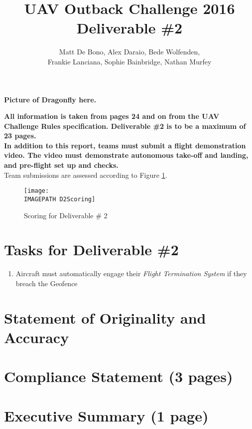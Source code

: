 \documentclass{article}
\title{UAV Outback Challenge 2016\\ \large Deliverable \#2\\}
\author{
	Matt De Bono,
	Alex Daraio,
	Bede Wolfenden,\\
	Frankie Lanciana,
	Sophie Bainbridge,
	Nathan Murfey}
\newcommand{\IMAGEPATH}{../Images/}
\begin{document}
\maketitle

\textbf{Picture of Dragonfly here.}

\newpage

\textbf{All information is taken from pages 24 and on from the UAV Challenge Rules specification. Deliverable \#2 is to be a maximum of 23 pages.}\\

\textbf{In addition to this report, teams must submit a flight demonstration video. The video must demonstrate autonomous take-off and landing, and pre-flight set up and checks.}\\

Team submissions are assessed according to Figure \ref{fig:D2Scoring}.

\begin{figure}[h]
	\centering
	\texttt{[image: \\IMAGEPATH D2Scoring]}
	\caption{Scoring for Deliverable \# 2}
	\label{fig:D2Scoring}
\end{figure}

\section{Tasks for Deliverable \#2}
\begin{enumerate}
	\item Aircraft must automatically engage their \textit{Flight Termination System} if they breach the Geofence
\end{enumerate}

\tableofcontents

\newpage

\section{Statement of Originality and Accuracy}


\newpage

\section{Compliance Statement (3 pages)}


\section{Executive Summary (1 page)}

\end{document}
